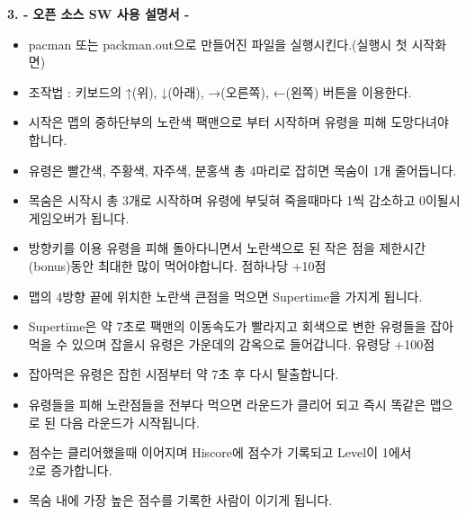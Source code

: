 \documentclass{article}
\begin{document}
\newpage
\textbf{3. - 오픈 소스 SW 사용 설명서 -}
\begin{itemize}
\item pacman 또는 packman.out으로 만들어진 파일을 실행시킨다.(실행시 첫 시작화면)
\item 조작법 : 키보드의 ↑(위), ↓(아래), →(오른쪽), ←(왼쪽) 버튼을 이용한다.
\item 시작은 맵의 중하단부의 노란색 팩맨으로 부터 시작하며 유령을 피해 도망다녀야 합니다.
\item 유령은 빨간색, 주황색, 자주색, 분홍색 총 4마리로 잡히면 목숨이 1개 줄어듭니다.
\item 목숨은 시작시 총 3개로 시작하며 유령에 부딪혀 죽을때마다 1씩 감소하고 0이될시 게임오버가 됩니다.
\item 방향키를 이용 유령을 피해 돌아다니면서 노란색으로 된 작은 점을 제한시간(bonus)동안 최대한 많이 먹어야합니다. 점하나당 +10점
\item 맵의 4방향 끝에 위치한 노란색 큰점을 먹으면 Supertime을 가지게 됩니다.
\item Supertime은 약 7초로 팩맨의 이동속도가 빨라지고 회색으로 변한 유령들을 잡아먹을 수 있으며 잡을시 유령은 가운데의 감옥으로 들어갑니다. 유령당 +100점
\item 잡아먹은 유령은 잡힌 시점부터 약 7초 후 다시 탈출합니다.
\item 유령들을 피해 노란점들을 전부다 먹으면 라운드가 클리어 되고 즉시 똑같은 맵으로 된 다음 라운드가 시작됩니다.
\item 점수는 클리어했을때 이어지며 Hiscore에 점수가 기록되고 Level이 1에서\\ 2로 증가합니다.
\item 목숨 내에 가장 높은 점수를 기록한 사람이 이기게 됩니다.
\end{itemize}
\end{document}
